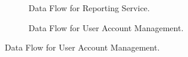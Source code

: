 \documentclass[12pt]{article}
\begin{document}
\begin{figure}
\begin{subfigure}[p]{0.47\textwidth}
\centering	
{}
\caption{Data Flow for Reporting Service.}
\end{subfigure}

\begin{subfigure}[p]{0.47\textwidth}
\centering	
{}
\caption{Data Flow for User Account Management.}
\end{subfigure}


\end{figure}
\end{document}
